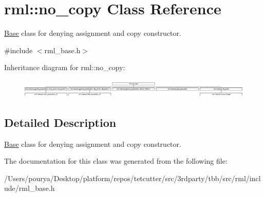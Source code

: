\hypertarget{classrml_1_1no__copy}{}\section{rml\+:\+:no\+\_\+copy Class Reference}
\label{classrml_1_1no__copy}


\hyperlink{structBase}{Base} class for denying assignment and copy constructor.  




{\ttfamily \#include $<$rml\+\_\+base.\+h$>$}

Inheritance diagram for rml\+:\+:no\+\_\+copy\+:\begin{figure}[H]
\begin{center}
\leavevmode
\includegraphics[height=0.925620cm]{classrml_1_1no__copy}
\end{center}
\end{figure}


\subsection{Detailed Description}
\hyperlink{structBase}{Base} class for denying assignment and copy constructor. 

The documentation for this class was generated from the following file\+:\begin{DoxyCompactItemize}
\item 
/\+Users/pourya/\+Desktop/platform/repos/tetcutter/src/3rdparty/tbb/src/rml/include/rml\+\_\+base.\+h\end{DoxyCompactItemize}
